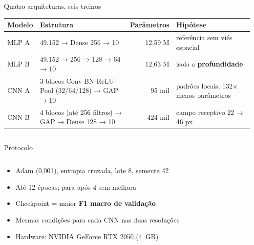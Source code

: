 \documentclass[aspectratio=169,10pt,t]{beamer}
\begin{document}
\begin{frame}{Quatro arquiteturas, seis treinos}
\small
\begin{tabularx}{\linewidth}{@{}lLrL@{}}
\toprule
Modelo & Estrutura & Parâmetros & Hipótese\\
\midrule
MLP A & 49.152 → Dense 256 → 10 & 12,59 M & referência sem viés espacial\\
MLP B & 49.152 → 256 → 128 → 64 → 10 & 12,63 M & isola a \textbf{profundidade}\\
CNN A & 3 blocos Conv-BN-ReLU-Pool (32/64/128) → GAP → 10 & 95 mil & padrões locais, 132× menos parâmetros\\
CNN B & 4 blocos (até 256 filtros) → GAP → Dense 128 → 10 & 424 mil & campo receptivo 22 → 46 px\\
\bottomrule
\end{tabularx}
\vskip3mm
\begin{columns}[T]
\begin{column}{0.48\textwidth}
\end{column}
\begin{column}{0.48\textwidth}
\end{column}
\end{columns}
\end{frame}

\begin{frame}{Protocolo}
\begin{columns}[T]
\begin{column}{0.5\textwidth}
\begin{itemize}
\item Adam (0,001), entropia cruzada, lote 8, semente 42
\item Até 12 épocas; para após 4 sem melhora
\item Checkpoint = maior \textbf{F1 macro de validação}
\item Mesmas condições para cada CNN nas duas resoluções
\item Hardware: NVIDIA GeForce RTX 2050 (4~GB)
\end{itemize}
\end{column}
\begin{column}{0.46\textwidth}
\end{column}
\end{columns}
\end{frame}
\end{document}
